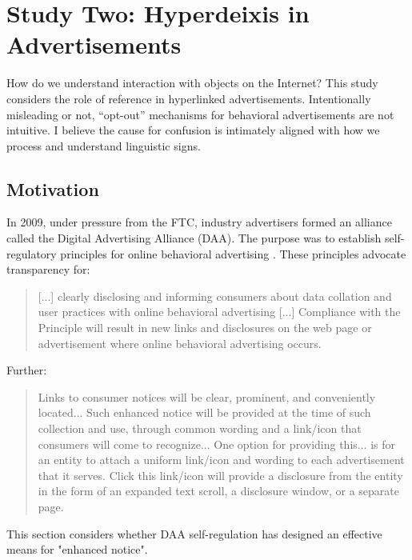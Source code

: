 \chapter{Study Two: Hyperdeixis in Advertisements}
\label{studytwo:hyperdeixisinadvertisements}

How do we understand interaction with objects on the Internet? This study considers the role of reference in hyperlinked advertisements. Intentionally misleading or not, ``opt-out'' mechanisms for behavioral advertisements are not intuitive. I believe the cause for confusion is intimately aligned with how we process and understand linguistic signs.

\section{Motivation}
\label{motivation}

In 2009, under pressure from the FTC, industry advertisers formed an alliance called the Digital Advertising Alliance (DAA). The purpose was to establish self-regulatory principles for online behavioral advertising  \citep{AAAA:2009uc}.  These principles advocate transparency for:

\begin{sloppier}
\begin{quote}
[...] clearly disclosing and informing consumers about data collation and user practices with online behavioral advertising [...] Compliance with the Principle will result in new links and disclosures on the web page or advertisement where online behavioral advertising occurs. \citep[p. 2]{AAAA:2009uc}
\end{quote}
\end{sloppier}
Further: 
\begin{quote}
Links to consumer notices will be clear, prominent, and conveniently located... Such enhanced notice will be provided at the time of such collection and use, through common wording and a link/icon that consumers will come to recognize... One option for providing this... is for an entity to attach a uniform link/icon and wording to each advertisement that it serves. Click this link/icon will provide a disclosure from the entity in the form of an expanded text scroll, a disclosure window, or a separate page.  \citep[p. 5]{AAAA:2009uc}
\end{quote}
\begin{sloppier}
This section considers whether DAA self-regulation has designed an effective means for "enhanced notice". 
\end{sloppier}


